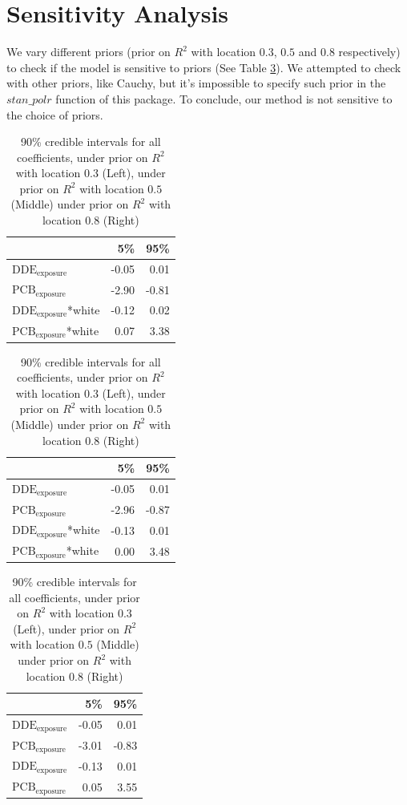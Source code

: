 \documentclass[wcp]{jmlr}%
\begin{document}
\section{Sensitivity Analysis}
We vary different priors (prior on $R^2$ with location $0.3$, $0.5$ and $0.8$ respectively) to check if the model is sensitive to priors (See Table \ref{tab:priors}). We attempted to check with other priors, like Cauchy, but it's impossible to specify such prior in the $stan\_polr$ function of this package. To conclude, our method is not sensitive to the choice of priors.

 \begin{table}
 	\footnotesize
 	\begin{tabular}{lrr}
			\toprule
			  & 5\% & 95\%\\
			\midrule
			$\text{DDE}_{\text{exposure}}$ & -0.05 & 0.01\\
			$\text{PCB}_{\text{exposure}}$ & -2.90 & -0.81\\
			\addlinespace
			$\text{DDE}_{\text{exposure}}$*white & -0.12 & 0.02\\
			$\text{PCB}_{\text{exposure}}$*white & 0.07 & 3.38\\
			\bottomrule
	\end{tabular}
 	\hfill
	\begin{tabular}{lrr}
			\toprule
			  & 5\% & 95\%\\
			\midrule
			$\text{DDE}_{\text{exposure}}$& -0.05 & 0.01\\
			$\text{PCB}_{\text{exposure}}$ & -2.96 & -0.87\\
			\addlinespace
			$\text{DDE}_{\text{exposure}}$*white & -0.13 & 0.01\\
			$\text{PCB}_{\text{exposure}}$*white & 0.00 & 3.48\\
			\bottomrule
	\end{tabular}
 	\hfill
	\begin{tabular}{lrr}
			\toprule
			  & 5\% & 95\%\\
			\midrule
			$\text{DDE}_{\text{exposure}}$ & -0.05 & 0.01\\
			$\text{PCB}_{\text{exposure}}$ & -3.01 & -0.83\\
			\addlinespace
			$\text{DDE}_{\text{exposure}}$ & -0.13 & 0.01\\
			$\text{PCB}_{\text{exposure}}$ & 0.05 & 3.55\\
			\bottomrule
	\end{tabular}
    \label{tab:priors} 
 	\caption{90\% credible intervals for all coefficients, under prior on $R^2$ with location $0.3$ (Left),  under prior on $R^2$ with location $0.5$ (Middle) under prior on $R^2$ with location $0.8$ (Right)}
 \end{table}
\end{document}
